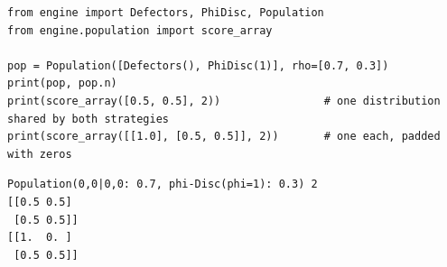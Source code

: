 \begin{lstlisting}[style=code]
from engine import Defectors, PhiDisc, Population
from engine.population import score_array

pop = Population([Defectors(), PhiDisc(1)], rho=[0.7, 0.3])
print(pop, pop.n)
print(score_array([0.5, 0.5], 2))                # one distribution shared by both strategies
print(score_array([[1.0], [0.5, 0.5]], 2))       # one each, padded with zeros
\end{lstlisting}
\begin{lstlisting}[style=output]
Population(0,0|0,0: 0.7, phi-Disc(phi=1): 0.3) 2
[[0.5 0.5]
 [0.5 0.5]]
[[1.  0. ]
 [0.5 0.5]]
\end{lstlisting}

